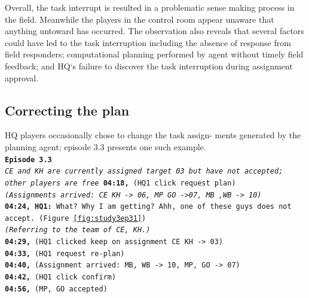 Overall, the task interrupt is resulted in a problematic sense making process in the field. Meanwhile the players in the control room appear unaware that anything untoward has occurred. The observation also reveals that several factors could have led to the task interruption including the absence of response from field responders; computational planning performed by agent without timely field feedback; and HQ`s failure to discover the task interruption during assignment approval. 


\subsection{Correcting the plan}
HQ players occasionally chose to change the task assign- ments generated by the planning agent; episode 3.3 presents one such example.\\

\noindent\texttt{\textbf{Episode 3.3}\\
\emph{CE and KH are currently assigned target 03 but have not accepted; other players are free}
\textbf{04:18,} (HQ1 click request plan)\\
\emph{(Assignments arrived: CE KH -> 06, MP GO ->07, MB ,WB -> 10)}\\
\textbf{04:24, HQ1:}  What? Why I am getting? Ahh, one of these guys does not accept. (Figure \ref{fig:study3ep31}) \\
\emph{(Referring to the team of CE, KH.)}\\
\textbf{04:29,} (HQ1 clicked keep on assignment CE KH -> 03) \\
\textbf{04:33,} (HQ1 request re-plan)\\
\textbf{04:40,} (Assignment arrived: MB, WB -> 10, MP, GO -> 07)\\
\textbf{04:42,} (HQ1 click confirm)\\
\textbf{04:56,} (MP, GO accepted)\\
}

